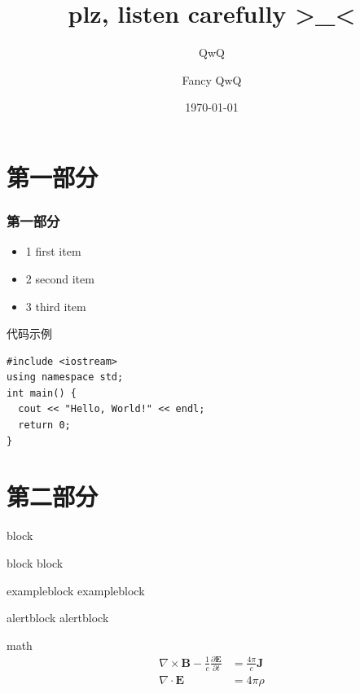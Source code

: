 \documentclass{ldr-simple-gray}
\title{plz, listen carefully >\_<}
\subtitle{QwQ}
\author{Fancy QwQ}
\institute[] {
  23电信基地班\\
  兰州大学算法与程序设计集训队
}
\date{\today}
\begin{document}
  \frame{\titlepage} %

  \section{第一部分}
  \begin{frame}
    \frametitle{第一部分}
    \begin{itemize}
      \item 1 first item
      \item 2 second item
      \item 3 third item
    \end{itemize}
  \end{frame}

  \begin{frame}[fragile]{代码示例}
    \begin{verbatim}
#include <iostream>
using namespace std;
int main() {
  cout << "Hello, World!" << endl;
  return 0;
}
    \end{verbatim}
  \end{frame}

  \section{第二部分}
  \begin{frame}{block}
    \begin{block}{block}
      block
    \end{block}
    \begin{exampleblock}{exampleblock}
      exampleblock
    \end{exampleblock}
    \begin{alertblock}{alertblock}
      alertblock
    \end{alertblock}
  \end{frame}

  \begin{frame}{math}
    \begin{equation}
      \begin{aligned}
        \nabla \times \mathbf{B} - \frac{1}{c} \frac{\partial \mathbf{E}}{\partial t} &= \frac{4\pi}{c} \mathbf{J} \\
        \nabla \cdot \mathbf{E} &= 4\pi \rho
      \end{aligned}
    \end{equation}
  \end{frame}
\end{document}
